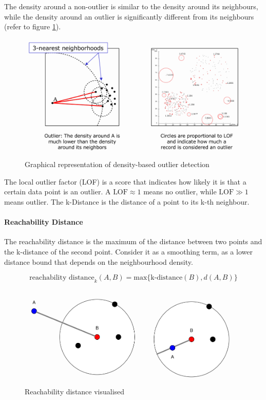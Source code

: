 \documentclass[a4paper, 11pt]{article}
\begin{document}
The density around a non-outlier is similar to the density around its neighbours, while the density around an outlier is significantly different from its neighbours (refer to figure \ref{fig:outlierdensity-based}).

\begin{figure}[tbh!]
    \centering
    \includegraphics[width=0.6\linewidth, keepaspectratio]{Pictures/outlier_density-based}
    \caption{Graphical representation of density-based outlier detection}
    \label{fig:outlierdensity-based}
\end{figure}

The local outlier factor (LOF) is a score that indicates how likely it is that a certain data point is an outlier. A $\text{LOF} \approx 1$ means no outlier, while $\text{LOF} \gg 1$ means outlier. The k-Distance is the distance of a point to its k-th neighbour.

\paragraph{Reachability Distance}

The reachability distance is the maximum of the distance between two points and the k-distance of the second point. Consider it as a smoothing term, as a lower distance bound that depends on the neighbourhood density.

\begin{equation}
    \text{reachability distance}_k (A,B) = \text{max}\{\text{k-distance}(B), d(A,B) \}
\end{equation}

\begin{figure}[tbh!]
    \centering
    \includegraphics[width=0.5\linewidth, keepaspectratio]{Pictures/outlier_reachability_distance}
    \caption{Reachability distance visualised}
    \label{fig:outlierreachabilitydistance}
\end{figure}
\end{document}

